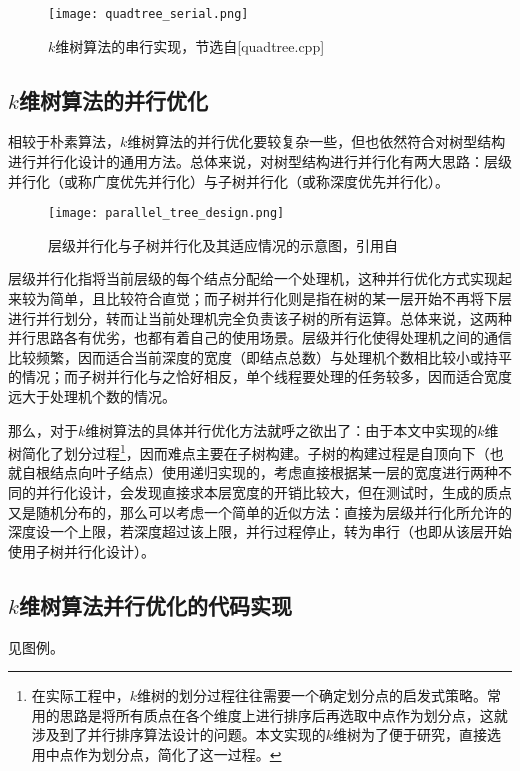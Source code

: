 \documentclass[lang=cn,11pt,a4paper,cite=authoryear]{elegantpaper}
\begin{document}
\begin{figure}[htbp]
  \centering
  \texttt{[image: quadtree\_serial.png]}
  \caption{$k$维树算法的串行实现，节选自[quadtree.cpp]}
\end{figure}

\subsection{$k$维树算法的并行优化}

相较于朴素算法，$k$维树算法的并行优化要较复杂一些，但也依然符合对树型结构进行并行化设计的通用方法。总体来说，对树型结构进行并行化有两大思路：层级并行化（或称广度优先并行化）与子树并行化（或称深度优先并行化）。

\begin{figure}[htbp]
  \centering
  \texttt{[image: parallel\_tree\_design.png]}
  \caption{层级并行化与子树并行化及其适应情况的示意图，引用自\cite{en2}}
\end{figure}

层级并行化指将当前层级的每个结点分配给一个处理机，这种并行优化方式实现起来较为简单，且比较符合直觉；而子树并行化则是指在树的某一层开始不再将下层进行并行划分，转而让当前处理机完全负责该子树的所有运算。总体来说，这两种并行思路各有优劣，也都有着自己的使用场景。层级并行化使得处理机之间的通信比较频繁，因而适合当前深度的宽度（即结点总数）与处理机个数相比较小或持平的情况；而子树并行化与之恰好相反，单个线程要处理的任务较多，因而适合宽度远大于处理机个数的情况。

那么，对于$k$维树算法的具体并行优化方法就呼之欲出了：由于本文中实现的$k$维树简化了划分过程\footnote{在实际工程中，$k$维树的划分过程往往需要一个确定划分点的启发式策略。常用的思路是将所有质点在各个维度上进行排序后再选取中点作为划分点，这就涉及到了并行排序算法设计的问题。本文实现的$k$维树为了便于研究，直接选用中点作为划分点，简化了这一过程。}，因而难点主要在子树构建。子树的构建过程是自顶向下（也就自根结点向叶子结点）使用递归实现的，考虑直接根据某一层的宽度进行两种不同的并行化设计，会发现直接求本层宽度的开销比较大，但在测试时，生成的质点又是随机分布的，那么可以考虑一个简单的近似方法：直接为层级并行化所允许的深度设一个上限，若深度超过该上限，并行过程停止，转为串行（也即从该层开始使用子树并行化设计）。

\subsection{$k$维树算法并行优化的代码实现}

见图例。
\end{document}

